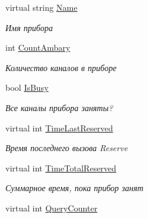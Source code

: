 \begin{DoxyCompactItemize}
\item 
virtual string \hyperlink{class_s_m_p_l_sharp_1_1_objects_1_1_smpl_multi_device_a8120bc9019cef69077019bc59c0acfa6}{Name}
\begin{DoxyCompactList}\small\item\em Имя прибора \end{DoxyCompactList}\item 
int \hyperlink{class_s_m_p_l_sharp_1_1_objects_1_1_smpl_multi_device_aefb2897375082ae37730737eedf4c1ec}{Count\-Ambary}
\begin{DoxyCompactList}\small\item\em Количество каналов в приборе \end{DoxyCompactList}\item 
bool \hyperlink{class_s_m_p_l_sharp_1_1_objects_1_1_smpl_multi_device_a20702c1214e518d92f2f9e2e8c66550e}{Is\-Busy}
\begin{DoxyCompactList}\small\item\em Все каналы прибора заняты? \end{DoxyCompactList}\item 
virtual int \hyperlink{class_s_m_p_l_sharp_1_1_objects_1_1_smpl_multi_device_a2194a701f0588035a4d3365211a23b3b}{Time\-Last\-Reserved}
\begin{DoxyCompactList}\small\item\em Время последнего вызова Reserve \end{DoxyCompactList}\item 
virtual int \hyperlink{class_s_m_p_l_sharp_1_1_objects_1_1_smpl_multi_device_a1d6b0142376d56ac7e2dc9bd977fe338}{Time\-Total\-Reserved}
\begin{DoxyCompactList}\small\item\em Суммарное время, пока прибор занят \end{DoxyCompactList}\item 
virtual int \hyperlink{class_s_m_p_l_sharp_1_1_objects_1_1_smpl_multi_device_a1d76170364b223e8e36d93ae178ab915}{Query\-Counter}

\end{DoxyCompactItemize}
